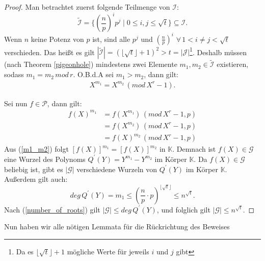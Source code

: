 \documentclass[12pt,oneside]{article}
\theoremstyle{remark}
\theoremstyle{definition}
\begin{document}
\begin{proof}
Man betrachtet zuerst folgende Teilmenge von $\mathcal{I}$:
\begin{equation}
    \widetilde{\mathcal{I}} = \{ (\frac{n}{p})^i p^j \mid 0 \leq i,j \leq \sqrt{t}\} \subseteq \mathcal{I}.
\end{equation}
Wenn $n$ keine Potenz von $p$ ist, sind alle $p^j$ und $(\frac{n}{p})^i$ $\forall \, 1 <  i \neq j < \sqrt{t}$ verschieden. Das heißt es gilt $|\widetilde{\mathcal{I}}| = (\lfloor \sqrt{t} \rfloor + 1)^2 > t = |\mathcal{J}|$\footnote{ Da es $ \lfloor \sqrt{t} \rfloor + 1$  mögliche Werte für jeweils $i$ und $j$ gibt}. Deshalb müssen (nach Theorem \ref{pigeonhole}) mindestens zwei Elemente $m_1,m_2 \in \widetilde{\mathcal{I}}$ existieren, sodass $m_1 = m_2 \, mod \, r$. O.B.d.A sei $m_1 > m_2 $, dann gilt:\newline
\begin{align*}
    X^{m_1} = X^{m_2} \, (mod \, X^r - 1).
\end{align*}

Sei nun $ f \in \mathcal{P}$, dann gilt:\newline
\begin{equation}\label{m1_m2}
    \begin{aligned}
         f(X)^{m_1} &= f(X^{m_1}) \, (mod \, X^r - 1, p) \\
        &= f(X^{m_2}) \, (mod \, X^r - 1,p) \\
        &= f(X)^{m_2} \, (mod \, X^r - 1,p)
    \end{aligned}
\end{equation}
Aus (\ref{m1_m2}) folgt $[f(X)]^{m_1} = [f(X)]^{m_2}$ in $\mathbb{K}$. Demnach ist $f(X) \in  \mathcal{G}$ eine Wurzel des Polynoms $Q^{'}(Y) = Y^{m_1} - Y^{m_2}$ im Körper $\mathbb{K}$. Da $f(X) \in \mathcal{G} $ beliebig ist, gibt es $|\mathcal{G}|$ verschiedene Wurzeln von $Q^{'}(Y)$ im Körper $\mathbb{K}$. Außerdem gilt auch:
\begin{equation}\label{degQ}
    deg \, Q^{'}(Y) = m_1 \leq (\frac{n}{p} \cdot p)^{\lfloor \sqrt{t} \rfloor} \leq n^{\sqrt{t}}. 
\end{equation}
Nach (\ref{number_of_roots}) gilt $|\mathcal{G}| \leq deg \, Q^{'}(Y)$, und folglich gilt $|\mathcal{G}| \leq n^{\sqrt{t}}$.\newline\newline
\end{proof}

Nun haben wir alle nötigen Lemmata für die Rückrichtung des Beweises
\end{document}
